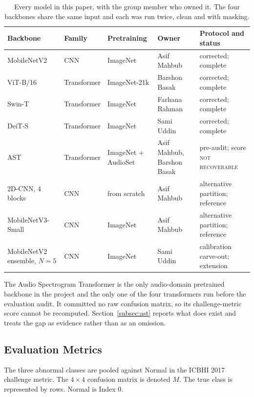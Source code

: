 \documentclass[journal,onecolumn]{IEEEtran}
\newcommand{\notrec}{\textsc{not recoverable}}
\begin{document}
\begin{table}[hbtp]
\centering
\caption{Every model in this paper, with the group member who owned it. The four backbones share the
same input and each was run twice, clean and with masking.}
\label{tab:models}
\footnotesize
\begin{tabular}{lllll}
\toprule
Backbone & Family & Pretraining & Owner & Protocol and status \\
\midrule
MobileNetV2~\cite{sandler2018mobilenetv2} & CNN & ImageNet & Asif Mahbub & corrected; complete \\
ViT-B/16~\cite{dosovitskiy2021vit} & Transformer & ImageNet-21k & Barshon Basak & corrected; complete \\
Swin-T~\cite{liu2021swin} & Transformer & ImageNet & Farhana Rahman & corrected; complete \\
DeiT-S~\cite{touvron2021deit} & Transformer & ImageNet & Sami Uddin & corrected; complete \\
\midrule
AST~\cite{gong2021ast} & Transformer & ImageNet + AudioSet & Asif Mahbub, Barshon Basak & pre-audit; score \notrec \\
2D-CNN, 4 blocks & CNN & from scratch & Asif Mahbub & alternative partition; reference \\
MobileNetV3-Small & CNN & ImageNet & Asif Mahbub & alternative partition; reference \\
MobileNetV2 ensemble, $N{=}5$ & CNN & ImageNet & Sami Uddin & calibration carve-out; extension \\
\bottomrule
\end{tabular}

\vspace{2pt}
\footnotesize The Audio Spectrogram Transformer is the only audio-domain pretrained backbone in
the project and the only one of the four transformers run before the evaluation audit. It
committed no raw confusion matrix, so its challenge-metric score cannot be recomputed.
Section~\ref{subsec:ast} reports what does exist and treats the gap as evidence rather than as
an omission.
\end{table}

\subsection{Evaluation Metrics}
\label{subsec:metrics}

The three abnormal classes are pooled against Normal in the ICBHI 2017 challenge
metric. The $4\times4$ confusion matrix is denoted $M$. The true class is represented
by rows. Normal is Index 0.
\end{document}
